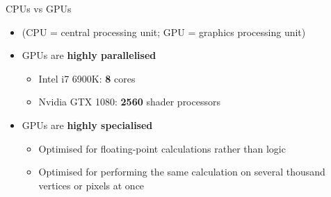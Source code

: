 \begin{frame}{CPUs vs GPUs}
	\begin{itemize}
		\pause \item (CPU = central processing unit; GPU = graphics processing unit)
		\pause \item GPUs are \textbf{highly parallelised}
			\begin{itemize}
				\pause \item Intel i7 6900K: \textbf{8} cores
				\pause \item Nvidia GTX 1080: \textbf{2560} shader processors
			\end{itemize}
		\pause \item GPUs are \textbf{highly specialised}
			\begin{itemize}
				\pause \item Optimised for floating-point calculations rather than logic
				\pause \item Optimised for performing the same calculation on several thousand vertices or pixels at once
			\end{itemize}
	\end{itemize}
\end{frame}

